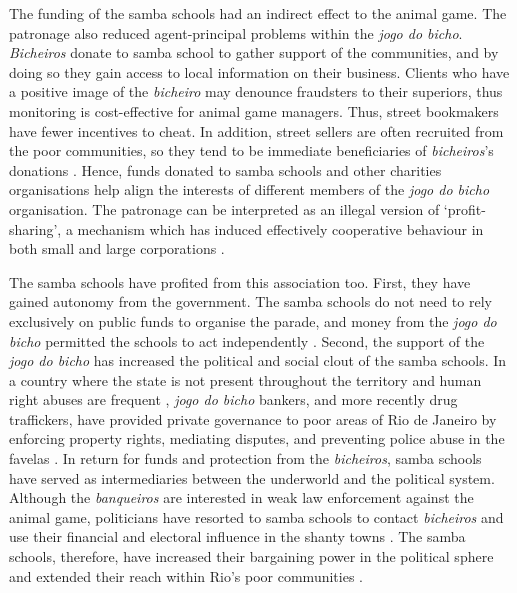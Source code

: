 \documentclass[a4paper,12pt]{article}
\begin{document}
The funding of the samba schools had an indirect effect to the animal game. The patronage also reduced agent-principal problems within the \emph{jogo do bicho}. \emph{Bicheiros} donate to samba school to gather support of the communities, and by doing so they gain access to local information on their business. Clients who have a positive image of the \emph{bicheiro} may denounce fraudsters to their superiors, thus monitoring is cost-effective for animal game managers. Thus, street bookmakers have fewer incentives to cheat. In addition, street sellers are often recruited from the poor communities, so they tend to be immediate beneficiaries of \emph{bicheiros}'s donations \citep{bbc2012aniz}. Hence, funds donated to samba schools and other charities organisations help align the interests of different members of the \emph{jogo do bicho} organisation. The patronage can be interpreted as an illegal version of `profit-sharing', a mechanism which has induced effectively cooperative behaviour in both small and large corporations \citep{cahuc1997profit,fitzroy1987cooperation, kruse1992profit}.

The samba schools have profited from this association too. First, they have gained autonomy from the government. The samba schools do not need to rely exclusively on public funds to organise the parade, and money from the \emph{jogo do bicho} permitted the schools to act independently \citep[209]{chinelli1993vazio}. Second, the support of the \emph{jogo do bicho} has increased the political and social clout of the samba schools. In a country where the state is not present throughout the territory and human right abuses are frequent \citep{ahnen2003,odonnell1993state,pinheiro2000,pinheiro2001}, \emph{jogo do bicho} bankers, and more recently drug traffickers, have provided private governance to poor areas of Rio de Janeiro by enforcing property rights, mediating disputes, and preventing police abuse in the favelas \citep{arias2006dynamics,goldstein2013laughter,leeds1996cocaine}. In return for funds and protection from the \emph{bicheiros}, samba schools have served as intermediaries between the underworld and the political system. Although the \emph{banqueiros} are interested in weak law enforcement against the animal game, politicians have resorted to samba schools to contact \emph{bicheiros} and use their financial and electoral influence in the shanty towns \citep[17]{misse2011crime}. The samba schools, therefore, have increased their bargaining power in the political sphere and extended their reach within Rio's poor communities \citep[215]{chinelli1993vazio}.
\end{document}
